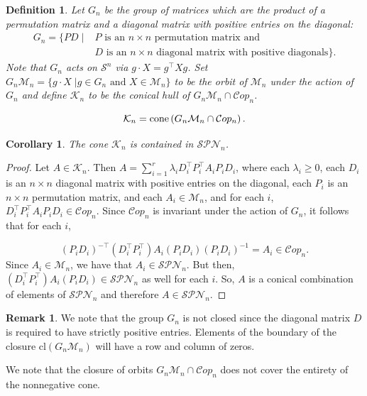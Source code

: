 \documentclass{amsart}
\def\cone{\mathop{\rm cone}}
\newcommand{\bbR}{\mathbb{R}}
\newcommand{\cM}{\mathcal{M}}
\newcommand{\cS}{\mathcal{S}}
\newcommand{\cK}{\mathcal{K}}
\newcommand{\Cop}{\mathcal{C}op}
\newcommand{\SPN}{\mathcal{SPN}}
\newtheorem{corollary}[theorem]{Corollary}
\newtheorem{definition}[theorem]{Definition}
\theoremstyle{definition}
\newtheorem{remark}[theorem]{Remark}
\begin{document}
\begin{definition}
Let $G_n$ be the group of matrices which are the product of a permutation matrix and a diagonal matrix with positive entries on the diagonal:  
\[
\begin{split}
G_n = \{PD \; \vert \; & P \text{ is an $n\times n$ permutation matrix and } \\ &D \text{ is an } n \times n \text{ diagonal matrix with positive diagonals}\}.
\end{split}
\]%
%
Note that $G_n$ acts on $\cS^n$ via $g\cdot X = g^\top X g$. Set $G_n\cM_n = \{g\cdot X\;\vert g\in G_n\text{ and } X \in \cM_n\}$ to be the orbit of $\cM_n$ under the action of $G_n$ and define $\cK_n$ to be the conical hull of $G_n\cM_n \cap \Cop_n$. 

\[\cK_n = \cone\left(G_n\cM_n \cap \Cop_n\right).\]
\end{definition}

\begin{corollary}\label{cor:GeneratedConeSPN}
The cone $\cK_n$ is contained in $\SPN_n$.
\end{corollary}

\begin{proof}
Let $A \in \cK_n$. Then $A = \sum_{i = 1}^r \lambda_i D_i^\top P_i^\top A_i P_i D_i$, where each $\lambda_i \geq 0$, each $D_i$ is an $n\times n$ diagonal matrix with positive entries on the diagonal, each $P_i$ is an $n\times n$ permutation matrix, and each $A_i \in \cM_n$, and for each $i$, $D_i^\top P_i^\top A_i P_i D_i \in \Cop_n$. Since $\Cop_n$ is invariant under the action of $G_n$, it follows that for each $i$, 

\[(P_iD_i)^{-\top}(D_i^\top P_i^\top)A_i(P_iD_i)(P_iD_i)^{-1} = A_i \in \Cop_n.\]
%
Since $A_i \in \cM_n$, we have that $A_i \in \SPN_n$. But then, $(D_i^\top P_i^\top)A_i(P_iD_i) \in \SPN_n$ as well for each $i$. So, $A$ is a conical combination of elements of $\SPN_n$ and therefore $A \in \SPN_n$.
\end{proof}

\begin{remark}\label{rem:NonClosedGroup}
We note that the group $G_n$ is not closed since the diagonal matrix $D$ is required to have strictly positive entries. Elements of the boundary of the closure $\mathrm{cl}(G_n\cM_n)$ will have a row and column of zeros.
\end{remark}

We note that the closure of orbits $G_n\cM_n \cap \Cop_n$ does not cover the entirety of the nonnegative cone. 
\end{document}
